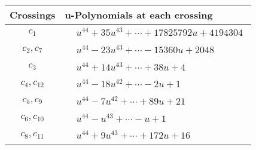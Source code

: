 \documentclass[1p]{elsarticle_modified}
\theoremstyle{definition}
\begin{document}
\begin{tabular}{m{50pt}|m{274pt}}
Crossings & \hspace{64pt}u-Polynomials at each crossing \\
\hline $$\begin{aligned}c_{1}\end{aligned}$$&$\begin{aligned}
&u^{44}+35 u^{43}+\cdots+17825792 u+4194304
\end{aligned}$\\
\hline $$\begin{aligned}c_{2},c_{7}\end{aligned}$$&$\begin{aligned}
&u^{44}-23 u^{43}+\cdots-15360 u+2048
\end{aligned}$\\
\hline $$\begin{aligned}c_{3}\end{aligned}$$&$\begin{aligned}
&u^{44}+14 u^{43}+\cdots+38 u+4
\end{aligned}$\\
\hline $$\begin{aligned}c_{4},c_{12}\end{aligned}$$&$\begin{aligned}
&u^{44}-18 u^{42}+\cdots-2 u+1
\end{aligned}$\\
\hline $$\begin{aligned}c_{5},c_{9}\end{aligned}$$&$\begin{aligned}
&u^{44}-7 u^{42}+\cdots+89 u+21
\end{aligned}$\\
\hline $$\begin{aligned}c_{6},c_{10}\end{aligned}$$&$\begin{aligned}
&u^{44}- u^{43}+\cdots- u+1
\end{aligned}$\\
\hline $$\begin{aligned}c_{8},c_{11}\end{aligned}$$&$\begin{aligned}
&u^{44}+9 u^{43}+\cdots+172 u+16
\end{aligned}$\\
\hline
\end{tabular}\\~\\
\newpage\renewcommand{\arraystretch}{1}
\end{document}
